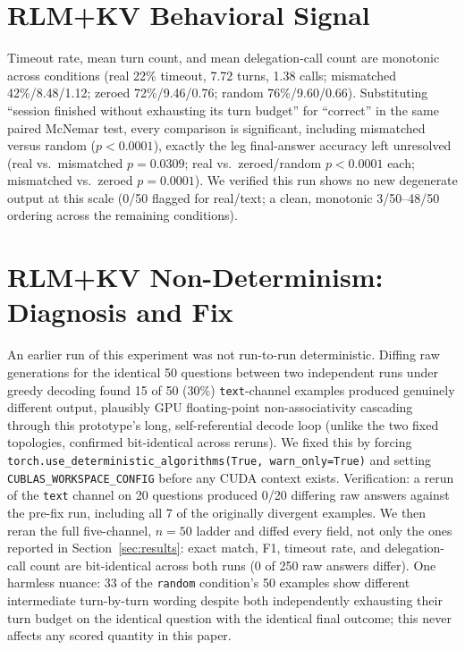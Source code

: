 \documentclass[11pt]{article}
\begin{document}
\section{RLM+KV Behavioral Signal}
\label{app:behavioral}

Timeout rate, mean turn count, and mean delegation-call count are
monotonic across conditions (real 22\% timeout, 7.72 turns, 1.38 calls;
mismatched 42\%/8.48/1.12; zeroed 72\%/9.46/0.76; random 76\%/9.60/0.66).
Substituting ``session finished without exhausting its turn budget''
for ``correct'' in the same paired McNemar test, every comparison is
significant, including mismatched versus random ($p<0.0001$), exactly
the leg final-answer accuracy left unresolved (real vs.\ mismatched
$p=0.0309$; real vs.\ zeroed/random $p<0.0001$ each; mismatched vs.\
zeroed $p=0.0001$). We verified this run shows no new degenerate output
at this scale (0/50 flagged for real/text; a clean, monotonic
3/50--48/50 ordering across the remaining conditions).

\section{RLM+KV Non-Determinism: Diagnosis and Fix}
\label{app:nondeterminism}

An earlier run of this experiment was not run-to-run deterministic.
Diffing raw generations for the identical 50 questions between two
independent runs under greedy decoding found 15 of 50 (30\%)
\texttt{text}-channel examples produced genuinely different output,
plausibly GPU floating-point non-associativity cascading through this
prototype's long, self-referential decode loop (unlike the two fixed
topologies, confirmed bit-identical across reruns). We fixed this by
forcing \texttt{torch.use\_deterministic\_algorithms(True,
warn\_only=True)} and setting \texttt{CUBLAS\_WORKSPACE\_CONFIG} before
any CUDA context exists. Verification: a rerun of the \texttt{text}
channel on 20 questions produced 0/20 differing raw answers against the
pre-fix run, including all 7 of the originally divergent examples. We
then reran the full five-channel, $n=50$ ladder and diffed every field,
not only the ones reported in Section~\ref{sec:results}: exact match,
F1, timeout rate, and delegation-call count are bit-identical across
both runs (0 of 250 raw answers differ). One harmless nuance: 33 of the
\texttt{random} condition's 50 examples show different intermediate
turn-by-turn wording despite both independently exhausting their turn
budget on the identical question with the identical final outcome; this
never affects any scored quantity in this paper.
\end{document}
